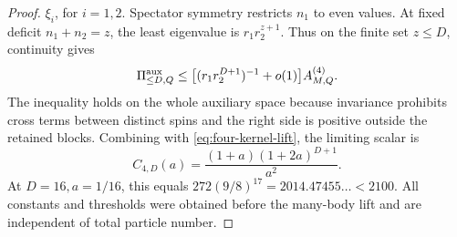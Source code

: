 \documentclass[11pt]{article}
\begin{document}
\begin{proof}
$\xi_i$, for $i=1,2$.
Spectator symmetry restricts $n_1$ to even values. At fixed deficit
$n_1+n_2=z$, the least eigenvalue is $r_1r_2^{z+1}$. Thus on the finite
set $z\le D$, continuity gives
\begin{equation}
 \Pi^{\rm aux}_{\le D,Q}
 \le\big[(r_1r_2^{D+1})^{-1}+o(1)\big]A^{(4)}_{M,Q}.
\end{equation}
The inequality holds on the whole auxiliary space because invariance
prohibits cross terms between distinct spins and the right side is positive
outside the retained blocks.
Combining with \eqref{eq:four-kernel-lift}, the limiting scalar is
\begin{equation}
 C_{4,D}(a)=\frac{(1+a)(1+2a)^{D+1}}{a^2}.
\end{equation}
At $D=16,a=1/16$, this equals $272(9/8)^{17}=2014.47455\ldots<2100$.
All constants and thresholds were obtained before the many-body lift and
are independent of total particle number.
\end{proof}
\end{document}
